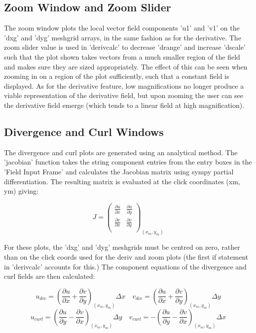 \documentclass[11]{report}
\begin{document}
\subsection{Zoom Window and Zoom Slider}
The zoom window plots the local vector field components 'u1' and 'v1' on the 'dxg' and 'dyg' meshgrid arrays, in the same fashion as for the derivative. The zoom slider value is used in 'deriv\textunderscore calc' to decrease 'd\textunderscore range' and increase 'd\textunderscore scale' such that the plot shown takes vectors from a much smaller region of the field and makes sure they are sized appropriately. The effect of this can be seen when zooming in on a region of the plot sufficiently, such that a constant field is displayed. As for the derivative feature, low magnifications no longer produce a viable representation of the derivative field, but upon zooming the user can see the derivative field emerge (which tends to a linear field at high magnification). 

\subsection{Divergence and Curl Windows}
The divergence and curl plots are generated using an analytical method. The 'jacobian' function takes the string component entries from the entry boxes in the 'Field Input Frame' and calculates the Jacobian matrix using sympy partial differentiation. The resulting matrix is evaluated at the click coordinates (x\textunderscore m, y\textunderscore m) giving:

\begin{equation}
	J =
	\begin{pmatrix}
		\frac{\partial u}{\partial x} & \frac{\partial u}{\partial y} \\
		\frac{\partial v}{\partial x} & \frac{\partial v}{\partial y} \\
	\end{pmatrix}
	_{(x_m,y_m)}
\end{equation}

For these plots, the 'dxg' and 'dyg' meshgrids must be centred on zero, rather than on the click coords used for the deriv and zoom plots (the first if statement in 'deriv\textunderscore calc' accounts for this.) The component equations of the divergence and curl fields are then calculated:

\begin{equation}
	u_{div} = \left( \frac{\partial u}{\partial x} + \frac{\partial v}{\partial y} \right)_{(x_m,y_m)} \Delta x \quad
	v_{div} = \left( \frac{\partial u}{\partial x} + \frac{\partial v}{\partial y} \right)_{(x_m,y_m)} \Delta y	
\end{equation}
\begin{equation}
	u_{curl} = \left( \frac{\partial u}{\partial y} - \frac{\partial v}{\partial x} \right)_{(x_m,y_m)} \Delta y \quad
	v_{curl} = - \left( \frac{\partial u}{\partial y} - \frac{\partial v}{\partial x} \right)_{(x_m,y_m)} \Delta x
\end{equation}
\end{document}
